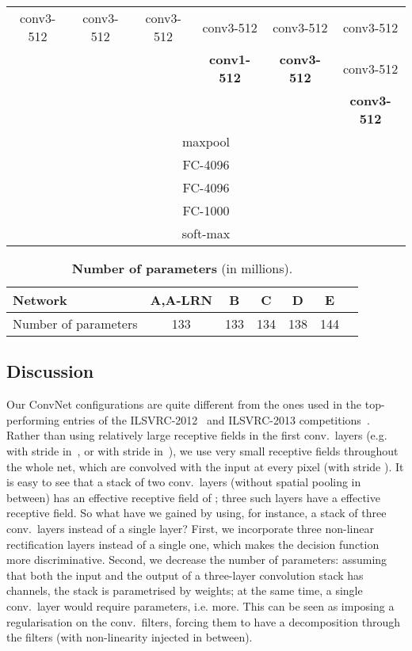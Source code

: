 \documentclass{article} \usepackage{iclr2015,times}
\makeatletter
\newcommand*{\eg}{e.g.\@\xspace}
\newcommand*{\ie}{i.e.\@\xspace}
\makeatother
\begin{document}
\begin{table}[htb]
\begin{tabular}{|c|c|c|c|c|c|}
conv3-512 & conv3-512 & conv3-512 & conv3-512 & conv3-512 & conv3-512 \\ 
& & & \textbf{conv1-512} & \textbf{conv3-512} & conv3-512 \\ 
& & & & & \textbf{conv3-512} \\ \hline
\multicolumn{6}{|c|}{maxpool} \\ \hline
\multicolumn{6}{|c|}{FC-4096} \\ \hline
\multicolumn{6}{|c|}{FC-4096} \\ \hline
\multicolumn{6}{|c|}{FC-1000} \\ \hline
\multicolumn{6}{|c|}{soft-max} \\ \hline
\end{tabular}
\label{tab:config}
\end{table}
\begin{table}[htb]
\small
\centering
\caption{\textbf{Number of parameters} (in millions).}
\begin{tabular}{|l|c|c|c|c|c|c|} \hline
Network & A,A-LRN & B & C & D & E \\ \hline
Number of parameters & 133 & 133 & 134 & 138 & 144 \\ \hline
\end{tabular}
\label{tab:num_params}
\end{table}

\subsection{Discussion}
\label{sec:discuss}
Our ConvNet configurations are quite different from the ones used in the top-performing entries of the ILSVRC-2012~\citep{Krizhevsky12} and ILSVRC-2013 competitions~\citep{Zeiler13,Sermanet14}.
Rather than using relatively large receptive fields in the first conv.\ layers (\eg  with stride  in~\citep{Krizhevsky12}, or  with stride  in~\citep{Zeiler13,Sermanet14}),
we use very small  receptive fields throughout the whole net, which are convolved with the input at every pixel (with stride ).
It is easy to see that a stack of two  conv.\ layers (without spatial pooling in between) has an effective receptive field of ;
three such layers have a  effective receptive field. 
So what have we gained by using, for instance, a stack of three  conv.\ layers instead of a single  layer?
First, we incorporate three non-linear rectification layers instead of a single one, which makes the decision function more discriminative.
Second, we decrease the number of parameters: assuming that both the input and the output of a three-layer  convolution stack has  channels, the stack is parametrised
by  weights; at the same time, a single  conv.\ layer would require  parameters, \ie  more.
This can be seen as imposing a regularisation on the  conv.\ filters, forcing them to have a decomposition through the  filters (with non-linearity injected in between).
\end{document}
